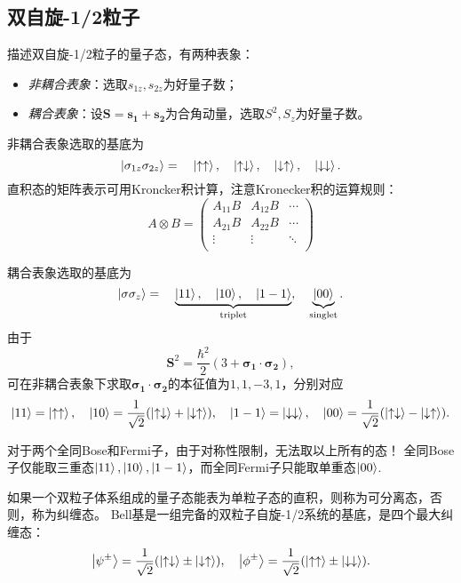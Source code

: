 \subsection{双自旋-1/2粒子}

描述双自旋-1/2粒子的量子态，有两种表象：
\begin{itemize}
    \item \emph{非耦合表象}：选取$s_{1z}, s_{2z}$为好量子数；
    \item \emph{耦合表象}：设$\bm{S}=\bm{s_1}+\bm{s_2}$为合角动量，选取$S^2, S_z$为好量子数。
\end{itemize}

非耦合表象选取的基底为
\begin{equation}
    \ket{\sigma_{1z}\sigma_{2z}} =\quad \ket{\uparrow\uparrow}, \quad \ket{\uparrow\downarrow}, \quad \ket{\downarrow\uparrow}, \quad \ket{\downarrow\downarrow}.
\end{equation}
直积态的矩阵表示可用Kroncker积计算，注意Kronecker积的运算规则：
\begin{equation}
    A \otimes B =
    \begin{pmatrix}
        A_{11}B & A_{12}B & \cdots \\
        A_{21}B & A_{22}B & \cdots \\
        \vdots  & \vdots  & \ddots \\
    \end{pmatrix}
\end{equation}

耦合表象选取的基底为
\begin{equation}
    \ket{\sigma \sigma_z} = \quad \underbrace{\ket{11}, \quad \ket{10}, \quad \ket{1-1}}_{\text{triplet}}, \quad \underbrace{\ket{00}}_{\text{singlet}}.
\end{equation}
由于
\begin{equation}
    \bm{S}^2 = \frac{\hbar^2}{2}(3+\bm{\sigma_1}\cdot\bm{\sigma_2}),
\end{equation}
可在非耦合表象下求取$\bm{\sigma_1}\cdot\bm{\sigma_2}$的本征值为$1,1,-3,1$，分别对应
\begin{equation}
    \ket{11}=\ket{\uparrow\uparrow},\quad \ket{10}=\frac{1}{\sqrt{2}}(\ket{\uparrow\downarrow}+\ket{\downarrow\uparrow}),\quad \ket{1-1}=\ket{\downarrow\downarrow}, \quad \ket{00}=\frac{1}{\sqrt{2}}(\ket{\uparrow\downarrow}-\ket{\downarrow\uparrow}).
\end{equation}

对于两个全同Bose和Fermi子，由于对称性限制，无法取以上所有的态！
全同Bose子仅能取三重态$\ket{11}, \ket{10}, \ket{1-1}$，而全同Fermi子只能取单重态$\ket{00}$.

如果一个双粒子体系组成的量子态能表为单粒子态的直积，则称为可分离态，否则，称为纠缠态。
Bell基是一组完备的双粒子自旋-1/2系统的基底，是四个最大纠缠态：
\begin{equation}
    \ket{\psi^{\pm}}=\frac{1}{\sqrt{2}}(\ket{\uparrow\downarrow}\pm\ket{\downarrow\uparrow}),\quad
    \ket{\phi^{\pm}}=\frac{1}{\sqrt{2}}(\ket{\uparrow\uparrow}\pm\ket{\downarrow\downarrow}).
\end{equation}
